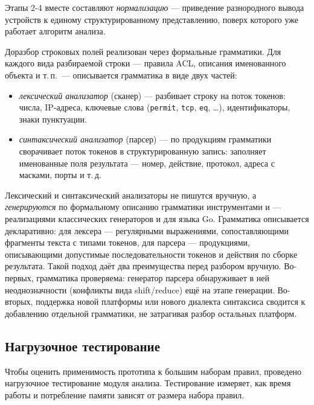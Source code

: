 Этапы 2-4 вместе составляют \emph{нормализацию} --- приведение разнородного вывода устройств к единому структурированному представлению, поверх которого уже работает алгоритм анализа.

Доразбор строковых полей реализован через формальные грамматики. Для каждого вида разбираемой строки --- правила ACL, описания именованного объекта и т.\,п.\ --- описывается грамматика в виде двух частей:

\begin{itemize}
    \item \emph{лексический анализатор} (сканер) --- разбивает строку на поток токенов: числа, IP-адреса, ключевые слова (\texttt{permit}, \texttt{tcp}, \texttt{eq}, \dots), идентификаторы, знаки пунктуации.
    \item \emph{синтаксический анализатор} (парсер) --- по продукциям грамматики сворачивает поток токенов в структурированную запись: заполняет именованные поля результата --- номер, действие, протокол, адреса с масками, порты и т.\,д.
\end{itemize}

Лексический и синтаксический анализаторы не пишутся вручную, а \emph{генерируются} по формальному описанию грамматики инструментами  и  --- реализациями классических генераторов  и  для языка Go. Грамматика описывается декларативно: для лексера --- регулярными выражениями, сопоставляющими фрагменты текста с типами токенов, для парсера --- продукциями, описывающими допустимые последовательности токенов и действия по сборке результата. Такой подход даёт два преимущества перед разбором вручную. Во-первых, грамматика проверяема: генератор парсера обнаруживает в ней неоднозначности (конфликты вида shift/reduce) ещё на этапе генерации. Во-вторых, поддержка новой платформы или нового диалекта синтаксиса сводится к добавлению отдельной грамматики, не затрагивая разбор остальных платформ.

\subsection{Нагрузочное тестирование}
\label{sec:Section4:benchmark}

Чтобы оценить применимость прототипа к большим наборам правил, проведено нагрузочное тестирование модуля анализа. Тестирование измеряет, как время работы и потребление памяти зависят от размера набора правил.

